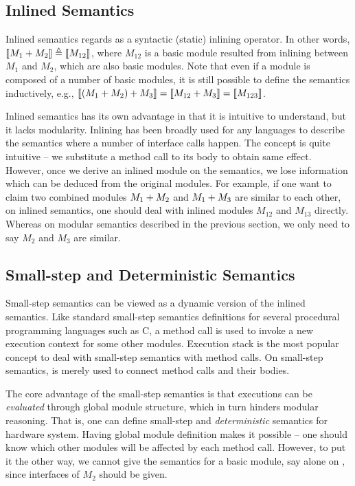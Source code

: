 \subsection{Inlined Semantics}

Inlined semantics regards \ModP{} as a syntactic (static) inlining
operator. In other words, $\llbracket M_1 +{} M_2 \rrbracket \triangleq
\llbracket M_{12} \rrbracket$, where $M_{12}$ is a basic module resulted from inlining
between $M_1$ and $M_2$, which are also basic modules. Note that even
if a module is composed of a number of basic modules, it is still
possible to define the semantics inductively, e.g., $\llbracket (M_1 +{}
  M_2) +{} M_3 \rrbracket = \llbracket M_{12} +{} M_3 \rrbracket = \llbracket M_{123} \rrbracket$.

Inlined semantics has its own advantage in that it is intuitive to
understand, but it lacks modularity. Inlining has been broadly used
for any languages to describe the semantics where a number of
interface calls happen. The concept is quite intuitive -- we
substitute a method call to its body to obtain same effect. However,
once we derive an inlined module on the semantics, we lose information
which can be deduced from the original modules. For example, if one
want to claim two combined modules $M_1 +{} M_2$ and $M_1 +{}
M_3$ are similar to each other, on inlined semantics, one should deal
with inlined modules $M_{12}$ and $M_{13}$ directly. Whereas on
modular semantics described in the previous section, we only need to
say $M_2$ and $M_3$ are similar.

\subsection{Small-step and Deterministic Semantics}

Small-step semantics can be viewed as a dynamic version of the inlined
semantics. Like standard small-step semantics definitions for several
procedural programming languages such as C, a method call is used to
invoke a new execution context for some other modules.  Execution
stack is the most popular concept to deal with small-step semantics
with method calls. On small-step semantics, \ModP{} is merely used to
connect method calls and their bodies.

The core advantage of the small-step semantics is that executions can
be \emph{evaluated} through global module structure, which in turn
hinders modular reasoning. That is, one can define small-step and
\emph{deterministic} semantics for hardware system. Having global
module definition makes it possible -- one should know which other
modules will be affected by each method call. However, to put it the
other way, we cannot give the semantics for a basic module, say
 alone on , since interfaces of $M_2$
should be given.

